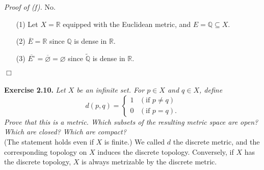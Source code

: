 \documentclass{article}
\begin{document}
\emph{Proof of (f).}
No.
\begin{enumerate}
\item[(1)]
Let $X = \mathbb{R}$ equipped with the Euclidean metric, and $E = \mathbb{Q} \subseteq X$.
\item[(2)]
$\overline{E} = \mathbb{R}$ since $\mathbb{Q}$ is dense in $\mathbb{R}$.
\item[(3)]
$\overline{E^\circ} = \overline{\varnothing} = \varnothing$
since $\widetilde{\mathbb{Q}}$ is dense in $\mathbb{R}$.
\end{enumerate}
$\Box$ \\\\






\textbf{Exercise 2.10.}
\emph{Let $X$ be an infinite set. For $p \in X$ and $q \in X$, define
\begin{equation*}
  d(p, q) =
    \begin{cases}
      1 & (\text{if } p \neq q) \\
      0 & (\text{if } p = q).
    \end{cases}
\end{equation*}
Prove that this is a metric.
Which subsets of the resulting metric space are open?
Which are closed?
Which are compact?} \\

(The statement holds even if $X$ is finite.)
We called $d$ the discrete metric,
and the corresponding topology on $X$ induces the discrete topology.
Conversely, if $X$ has the discrete topology, $X$ is always metrizable by the discrete metric. \\
\end{document}
